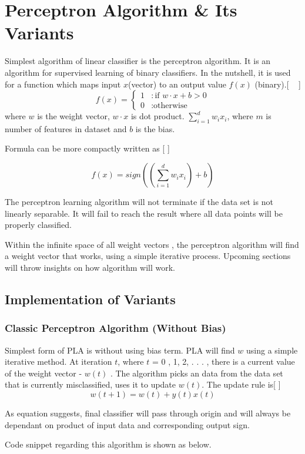 \documentclass{article}
\begin{document}
\section{Perceptron Algorithm \& Its Variants}
Simplest algorithm of linear classifier is the perceptron algorithm. It is an algorithm for supervised learning of binary classifiers. In the nutshell, it is used for a function which maps input \(x\)(vector) to an output value
\(f(x)\) (binary).[ ~\citep{Online1} ]
\begin{equation}
f(x) = 
\begin{cases} 
1 & : \text{if  } w \cdot x + b > 0 \\
0 & : \text{otherwise}
\end{cases}
\end{equation}
where \(w\) is the weight vector, \(w \cdot x\) is dot product. \(\sum_{i=1}^{d} w_ix_i\), where \(m\) is number of features in dataset and \(b\) is the bias.\\
\par Formula can be more compactly written as [ \cite{Book1} ] 

\begin{equation}
f(x) = sign((\sum_{i=1}^{d} w_ix_i) + b)
\end{equation}
\par The perceptron learning algorithm will not terminate if the data set is not linearly separable. It will fail to reach the result where all data points will be properly classified.
\par Within the infinite space of all weight vectors , the perceptron algorithm will find a weight vector that works, using a simple iterative process. Upcoming sections will throw insights on how algorithm will work.

\subsection{Implementation of Variants}
\subsubsection{Classic Perceptron Algorithm (Without Bias)}
Simplest form of PLA is without using bias term. PLA will find \(w\) using a simple iterative method. At iteration \(t\), where \(t\) = 0 , 1, 2, . . . , there is a current value of the weight vector - \(w(t)\) . The algorithm picks an data from the data set that is currently misclassified, uses it to update \(w(t)\). The update rule is[ \cite{Book1} ]
\begin{equation}
w(t + 1) = w(t) + y (t)x(t)
\end{equation}
\par As equation suggests, final classifier will pass through origin and will always be dependant on product of input data and corresponding output sign.
\par Code snippet regarding this algorithm is shown as below.
\end{document}
